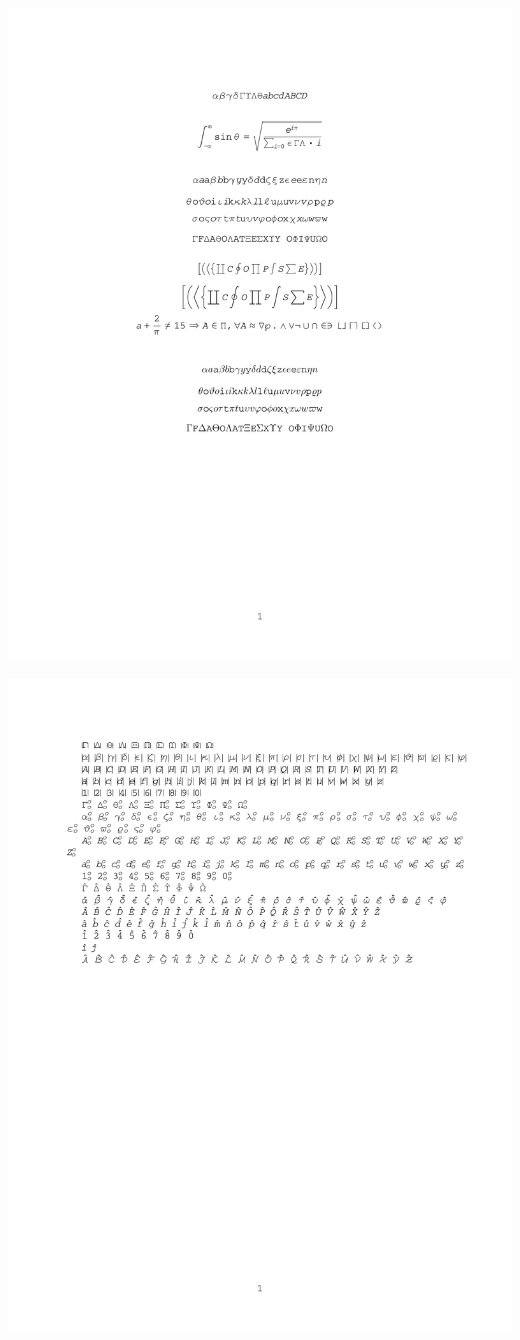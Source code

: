 \documentclass[twocolumn]{article}
\begin{document}
 \noindent\includegraphics*{../results/courier-font}\par
{} \noindent\includegraphics*{../results/courier-pos}\par
\end{document}
